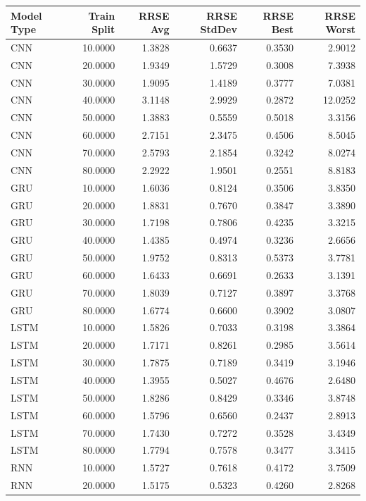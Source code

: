 \begin{tabular}{lrrrrr}
\toprule
Model Type & Train Split & RRSE Avg & RRSE StdDev & RRSE Best & RRSE Worst \\
\midrule
CNN & 10.0000 & 1.3828 & 0.6637 & 0.3530 & 2.9012 \\
CNN & 20.0000 & 1.9349 & 1.5729 & 0.3008 & 7.3938 \\
CNN & 30.0000 & 1.9095 & 1.4189 & 0.3777 & 7.0381 \\
CNN & 40.0000 & 3.1148 & 2.9929 & 0.2872 & 12.0252 \\
CNN & 50.0000 & 1.3883 & 0.5559 & 0.5018 & 3.3156 \\
CNN & 60.0000 & 2.7151 & 2.3475 & 0.4506 & 8.5045 \\
CNN & 70.0000 & 2.5793 & 2.1854 & 0.3242 & 8.0274 \\
CNN & 80.0000 & 2.2922 & 1.9501 & 0.2551 & 8.8183 \\
GRU & 10.0000 & 1.6036 & 0.8124 & 0.3506 & 3.8350 \\
GRU & 20.0000 & 1.8831 & 0.7670 & 0.3847 & 3.3890 \\
GRU & 30.0000 & 1.7198 & 0.7806 & 0.4235 & 3.3215 \\
GRU & 40.0000 & 1.4385 & 0.4974 & 0.3236 & 2.6656 \\
GRU & 50.0000 & 1.9752 & 0.8313 & 0.5373 & 3.7781 \\
GRU & 60.0000 & 1.6433 & 0.6691 & 0.2633 & 3.1391 \\
GRU & 70.0000 & 1.8039 & 0.7127 & 0.3897 & 3.3768 \\
GRU & 80.0000 & 1.6774 & 0.6600 & 0.3902 & 3.0807 \\
LSTM & 10.0000 & 1.5826 & 0.7033 & 0.3198 & 3.3864 \\
LSTM & 20.0000 & 1.7171 & 0.8261 & 0.2985 & 3.5614 \\
LSTM & 30.0000 & 1.7875 & 0.7189 & 0.3419 & 3.1946 \\
LSTM & 40.0000 & 1.3955 & 0.5027 & 0.4676 & 2.6480 \\
LSTM & 50.0000 & 1.8286 & 0.8429 & 0.3346 & 3.8748 \\
LSTM & 60.0000 & 1.5796 & 0.6560 & 0.2437 & 2.8913 \\
LSTM & 70.0000 & 1.7430 & 0.7272 & 0.3528 & 3.4349 \\
LSTM & 80.0000 & 1.7794 & 0.7578 & 0.3477 & 3.3415 \\
RNN & 10.0000 & 1.5727 & 0.7618 & 0.4172 & 3.7509 \\
RNN & 20.0000 & 1.5175 & 0.5323 & 0.4260 & 2.8268 \\

\end{tabular}
